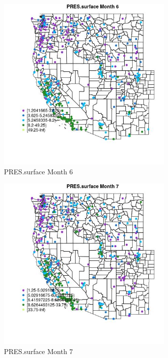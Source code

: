 \begin{figure} 
\centering  
\includegraphics[width=0.77\textwidth]{Code_Outputs/ML_input_report_ML_input_PM25_Step5_part_d_de_duplicated_aves_ML_input_MapObsMo6PRESsurface.jpg} 
\caption{\label{fig:ML_input_report_ML_input_PM25_Step5_part_d_de_duplicated_aves_ML_inputMapObsMo6PRESsurface}PRES.surface Month 6} 
\end{figure} 
 

\begin{figure} 
\centering  
\includegraphics[width=0.77\textwidth]{Code_Outputs/ML_input_report_ML_input_PM25_Step5_part_d_de_duplicated_aves_ML_input_MapObsMo7PRESsurface.jpg} 
\caption{\label{fig:ML_input_report_ML_input_PM25_Step5_part_d_de_duplicated_aves_ML_inputMapObsMo7PRESsurface}PRES.surface Month 7} 
\end{figure} 
 

